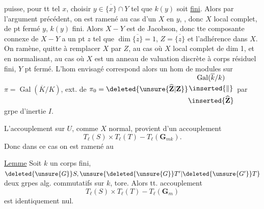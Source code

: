 puisse, pour tt tel $x$, choisir $y\in\overline{\{x\}}\cap Y$ tel que $k(y)$ soit \uline{fini}.  Alors par l'argument précédent, on est ramené au cas d'un   $X$ en $y$, , donc $X$ local complet, de pt fermé $y$,  $k(y)$ fini. Alors $X-Y$ est de Jacobson, donc tte composante connexe de $X-Y$ a un pt $z$ tel que $\dim\overline{\{z\}}=1$,  $Z=\overline{\{z\}}$ et  l'adhérence dans $X$. On  ramène,  quitte à remplacer $X$ par $Z$, au cas où $X$ local complet de dim 1, et en normalisant, au cas où $X$ est  un anneau de valuation discrète  à corps résiduel fini, $Y$ pt fermé. L'hom envisagé correspond alors  un hom de modules sur $\pi=\operatorname{Gal}(\overline K/K)$, ext. de $\pi_0=\deleted{\unsure{\widehat{\mathbf Z}|\mathbf Z}}\begin{gathered}\operatorname{Gal}(\overline k/k)\\ \inserted{\Vert}\\ \inserted{\widehat{\mathbf Z}}\end{gathered}$ par grpe d'inertie $I$.


L'accouplement sur $U$, comme $X$ normal, provient d'un accouplement
\[
T_\ell(S)\times T_\ell(T)\mathbin{-}T_\ell(\mathbf G_{mk}).
\]
Donc dans ce cas on est ramené au

\uline{Lemme} Soit $k$ un corps fini, $\deleted{\unsure{G}}S,\unsure{\deleted{\unsure{G}}T'|\deleted{\unsure{G'}}T}$ deux grpes alg. commutatifs sur $k$,    tore. Alors tt. accouplement
\[
T_\ell(S)\times T_\ell(T)\mathbin{-}T_\ell(\mathbf G_m)
\]
est identiquement nul.
